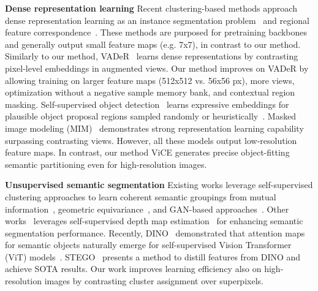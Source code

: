 \documentclass{bmvc2k}
\begin{document}
\noindent
\textbf{Dense representation learning} Recent clustering-based methods approach dense representation learning as an instance segmentation problem~\cite{Chen2021MultiSiamSM, Li2021DenseSC, Henaff2021EfficientVP, Zhang2020HierarchicalGrouping} and regional feature correspondence~\cite{Wang2012DenseCL, Li2021DSCL, Xie2021PixPro}. These methods are purposed for pretraining backbones and generally output small feature maps (e.g. 7x7), in contrast to our method. Similarly to our method, VADeR~\cite{Pinheiro2020VADeR} learns dense representations by contrasting pixel-level embeddings in augmented views. Our method improves on VADeR by allowing training on larger feature maps (512x512 vs. 56x56 px), more views, optimization without a negative sample memory bank, and contextual region masking. Self-supervised object detection~\cite{Bar2021DETReg, Wei2021AligningPF, Yang2021InstanceLF, Dai2021UPDET, Wang2021DenseCL, Xiao2021RegionSR} learns expressive embeddings for plausible object proposal regions sampled randomly or heuristically~\cite{Uijlings2013SelectiveSearch}. Masked image modeling (MIM)~\cite{He2021MaskedAA, Xie2021SimMIMAS, Bao2022BEiT, Chen2022CAE} demonstrates strong representation learning capability surpassing contrasting views. However, all these models output low-resolution feature maps. In contrast, our method ViCE generates precise object-fitting semantic partitioning even for high-resolution images.

\noindent
\textbf{Unsupervised semantic segmentation} Existing works leverage self-supervised clustering approaches to learn coherent semantic groupings from mutual information~\cite{Ji2019IIC, Ouali2020AutoregSem}, geometric equivariance~\cite{Cho2021PiCIE}, and GAN-based approaches~\cite{Chen2019UnsupervisedOS,Bielski2019EmergenceOO}. Other works~\cite{Hoyer2021ThreeWT,Vu2019DADA} leverages self-supervised depth map estimation~\cite{Godard2019DiggingIS,Bello2020ForgetAT} for enhancing semantic segmentation performance. Recently, DINO~\cite{Caron2021DINO} demonstrated that attention maps for semantic objects naturally emerge for self-supervised Vision Transformer (ViT) models~\cite{Dosovitskiy2021ViT, Vaswani2017AttentionIA}. STEGO~\cite{Hamilton2022STEGO} presents a method to distill features from DINO and achieve SOTA results. Our work improves learning efficiency also on high-resolution images by contrasting cluster assignment over superpixels.
\end{document}
